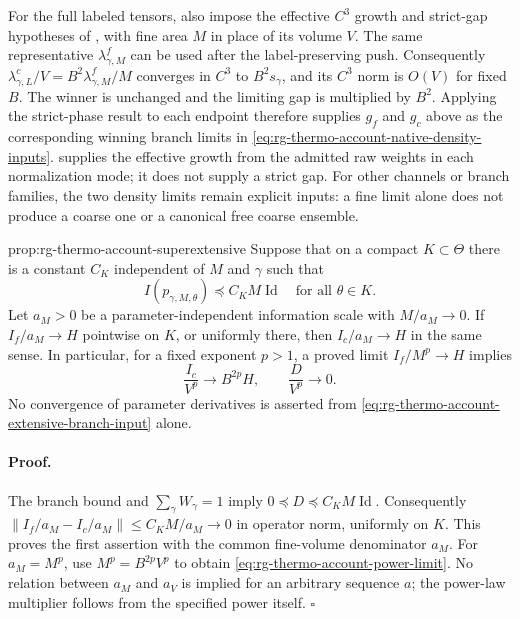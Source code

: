 For the full labeled tensors, also impose the effective $C^3$ growth
and strict-gap hypotheses of , with
fine area $M$ in place of its volume $V$. The same representative
$\lambda^f_{\gamma,M}$ can be used after the label-preserving push.
Consequently $\lambda^c_{\gamma,L}/V=B^2\lambda^f_{\gamma,M}/M$
converges in $C^3$ to $B^2s_\gamma$, and its $C^3$ norm is
$O(V)$ for fixed $B$. The winner is unchanged and the limiting gap is
multiplied by $B^2$. Applying the strict-phase result to each endpoint
therefore supplies $g_f$ and $g_c$ above as the corresponding winning
branch limits in \cref{eq:rg-thermo-account-native-density-inputs}.
 supplies the effective
growth from the admitted raw weights in each normalization mode; it
does not supply a strict gap. For other channels or branch families,
the two density limits remain explicit inputs: a fine limit alone does
not produce a coarse one or a canonical free coarse ensemble.\thermoestablishedstatus

{prop:rg-thermo-account-superextensive}
Suppose that on a compact $K\subset\Theta$ there is a constant $C_K$
independent of $M$ and $\gamma$ such that
\begin{equation}
 I(p_{\gamma,M,\theta})\preceq C_K M\operatorname{Id}
 \quad\text{for all }\theta\in K.
 \label{eq:rg-thermo-account-extensive-branch-input}
\end{equation}
Let $a_M>0$ be a parameter-independent information scale with
$M/a_M\to0$. If $I_f/a_M\to H$ pointwise on $K$, or uniformly
there, then $I_c/a_M\to H$ in the same sense. In particular, for a
fixed exponent $p>1$, a proved limit $I_f/M^p\to H$ implies
\begin{equation}
 \frac{I_c}{V^p}\longrightarrow B^{2p}H,
 \qquad \frac{D}{V^p}\longrightarrow0.
 \label{eq:rg-thermo-account-power-limit}
\end{equation}
No convergence of parameter derivatives is asserted from
\cref{eq:rg-thermo-account-extensive-branch-input} alone.\thermoestablishedstatus


\paragraph{Proof.}
The branch bound and $\sum_\gamma W_\gamma=1$ imply
$0\preceq D\preceq C_KM\operatorname{Id}$. Consequently
$\|I_f/a_M-I_c/a_M\|\leq C_KM/a_M\to0$ in operator norm,
uniformly on $K$. This proves the first assertion with the common
fine-volume denominator $a_M$. For $a_M=M^p$, use
$M^p=B^{2p}V^p$ to obtain
\cref{eq:rg-thermo-account-power-limit}. No relation between $a_M$
and $a_V$ is implied for an arbitrary sequence $a$; the power-law
multiplier follows from the specified power itself. $\square$

